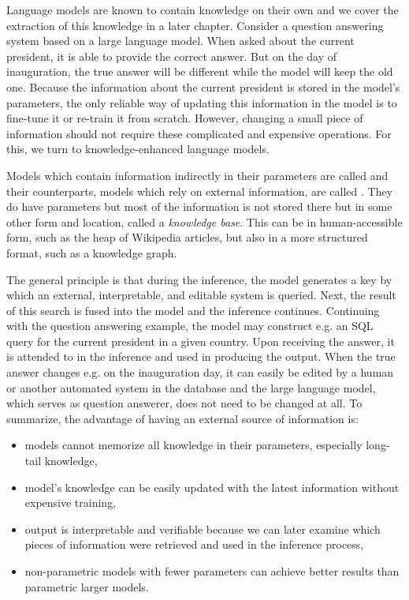 Language models are known to contain knowledge on their own \citep{petroni2019language,petroni2020how} and we cover the extraction of this knowledge in a later chapter.
Consider a question answering system based on a large language model.
When asked about the current president, it is able to provide the correct answer.
But on the day of inauguration, the true answer will be different while the model will keep the old one.
Because the information about the current president is stored in the model's parameters, the only reliable way of updating this information in the model is to fine-tune it or re-train it from scratch.
However, changing a small piece of information should not require these complicated and expensive operations.
For this, we turn to knowledge-enhanced language models.

Models which contain information indirectly in their parameters are called    and their counterparts, models which rely on external information, are called .
They do have parameters but most of the information is not stored there but in some other form and location, called a \textit{knowledge base}.
This can be in human-accessible form, such as the heap of Wikipedia articles, but also in a more structured format, such as a knowledge graph.

The general principle is that during the inference, the model generates a key by which an external, interpretable, and editable system is queried.
Next, the result of this search is fused into the model and the inference continues.
Continuing with the question answering example, the model may construct e.g. an SQL query for the current president in a given country.
Upon receiving the answer, it is attended to in the inference and used in producing the output.
When the true answer changes e.g. on the inauguration day, it can easily be edited by a human or another automated system in the database and the large language model, which serves as question answerer, does not need to be changed at all.
To summarize, the advantage of having an external source of information is:
\begin{itemize}
    \item models cannot memorize all knowledge in their parameters, especially long-tail knowledge,
    \item model's knowledge can be easily updated with the latest information without expensive training,
    \item output is interpretable and verifiable because we can later examine which pieces of information were retrieved and used in the inference process,
    \item non-parametric models with fewer parameters can achieve better results than parametric larger models.
\end{itemize}


